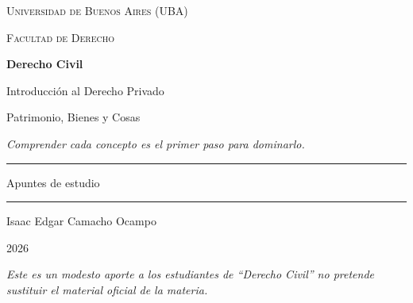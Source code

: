 \documentclass[12pt,oneside]{book}
\newcommand{\universidad}{Universidad de Buenos Aires (UBA)}
\newcommand{\facultad}{Facultad de Derecho}
\newcommand{\materia}{Derecho Civil}
\newcommand{\subtitulomateria}{Introducción al Derecho Privado}
\newcommand{\titulo}{Patrimonio, Bienes y Cosas}
\newcommand{\autor}{Isaac Edgar Camacho Ocampo}
\newcommand{\anio}{2026}
\begin{document}

\begin{titlepage}

\thispagestyle{empty}

\begin{center}

\vspace*{1cm}

{\large \textsc{\universidad}}

\vspace{0.2cm}

{\large \textsc{\facultad}}

\vspace{3cm}

{\Huge \textbf{\materia}}

\vspace{0.3cm}

{\large \subtitulomateria}

\vspace{1cm}

{\LARGE \titulo}

\vspace{0.8cm}

\textit{Comprender cada concepto es el primer paso para dominarlo.}

\vspace{1.2cm}

\rule{0.70\textwidth}{0.5pt}

\vspace{0.5cm}

{\large Apuntes de estudio}

\vspace{0.5cm}

\rule{0.70\textwidth}{0.5pt}

\vfill

{\large \autor}

\vspace{0.3cm}

{\large \anio}

\end{center}

\vfill

\begin{flushleft}
\textit{Este es un modesto aporte a los estudiantes de ``\materia'' no pretende sustituir el material oficial de la materia.}
\end{flushleft}

\end{titlepage}
\end{document}
